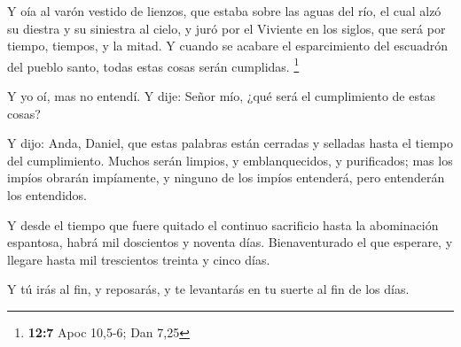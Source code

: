  Y oía al varón vestido de lienzos, que estaba sobre las
aguas del río, el cual alzó su diestra y su siniestra al cielo, y juró
por el Viviente en los siglos, que será por tiempo, tiempos, y la mitad.
Y cuando se acabare el esparcimiento del escuadrón del pueblo santo,
todas estas cosas serán cumplidas. \footnote{\textbf{12:7} Apoc 10,5-6;
  Dan 7,25}

 Y yo oí, mas no entendí. Y dije: Señor mío, ¿qué será el
cumplimiento de estas cosas?

 Y dijo: Anda, Daniel, que estas palabras están cerradas y
selladas hasta el tiempo del cumplimiento.  Muchos serán
limpios, y emblanquecidos, y purificados; mas los impíos obrarán
impíamente, y ninguno de los impíos entenderá, pero entenderán los
entendidos.

 Y desde el tiempo que fuere quitado el continuo sacrificio
hasta la abominación espantosa, habrá mil doscientos y noventa días.
 Bienaventurado el que esperare, y llegare hasta mil
trescientos treinta y cinco días.

 Y tú irás al fin, y reposarás, y te levantarás en tu
suerte al fin de los días.
